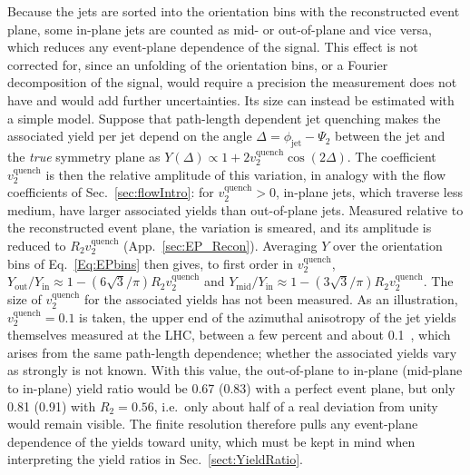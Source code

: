 Because the jets are sorted into the orientation bins with the reconstructed event plane, some in-plane jets are counted as mid- or out-of-plane and vice versa, which reduces any event-plane dependence of the signal.
%
This effect is not corrected for, since an unfolding of the orientation bins, or a Fourier decomposition of the signal, would require a precision the measurement does not have and would add further uncertainties.
%
Its size can instead be estimated with a simple model.
%
Suppose that path-length dependent jet quenching makes the associated yield per jet depend on the angle \(\Delta = \phi_\mathrm{jet} - \Psi_2\) between the jet and the \emph{true} symmetry plane as \(Y(\Delta) \propto 1 + 2 v_2^\mathrm{quench}\cos(2\Delta)\).
%
The coefficient $v_2^\mathrm{quench}$ is then the relative amplitude of this variation, in analogy with the flow coefficients of Sec.~\ref{sec:flowIntro}: for $v_2^\mathrm{quench} > 0$, in-plane jets, which traverse less medium, have larger associated yields than out-of-plane jets.
%
Measured relative to the reconstructed event plane, the variation is smeared, and its amplitude is reduced to $R_2 v_2^\mathrm{quench}$ (App.~\ref{sec:EP_Recon}).
%
Averaging $Y$ over the orientation bins of Eq.~\ref{Eq:EPbins} then gives, to first order in $v_2^\mathrm{quench}$, $Y_\mathrm{out}/Y_\mathrm{in} \approx 1 - (6\sqrt{3}/\pi) R_2 v_2^\mathrm{quench}$ and $Y_\mathrm{mid}/Y_\mathrm{in} \approx 1 - (3\sqrt{3}/\pi) R_2 v_2^\mathrm{quench}$.
%
The size of $v_2^\mathrm{quench}$ for the associated yields has not been measured.
%
As an illustration, $v_2^\mathrm{quench} = 0.1$ is taken, the upper end of the azimuthal anisotropy of the jet yields themselves measured at the LHC, between a few percent and about 0.1~\cite{ALICE:2015efi,ATLAS:2021ktw}, which arises from the same path-length dependence; whether the associated yields vary as strongly is not known.
%
With this value, the out-of-plane to in-plane (mid-plane to in-plane) yield ratio would be 0.67 (0.83) with a perfect event plane, but only 0.81 (0.91) with $R_2 = 0.56$, i.e.\ only about half of a real deviation from unity would remain visible.
%
The finite resolution therefore pulls any event-plane dependence of the yields toward unity, which must be kept in mind when interpreting the yield ratios in Sec.~\ref{sect:YieldRatio}.


